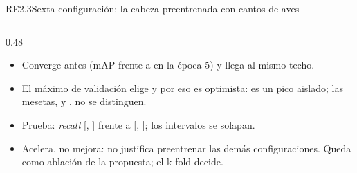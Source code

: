 \documentclass[aspectratio=169, 9pt]{beamer}
\begin{document}
\begin{frame}{RE2.3}{Sexta configuración: la cabeza preentrenada con cantos de aves}
\begin{columns}[T]
\begin{column}{0.48\textwidth}
            \begin{itemize}
                \item Converge antes (mAP \birdsEpochFive{} frente a \logmelEpochFive{} en la
                      época 5) y llega al mismo techo.
                \item El máximo de validación elige  y por eso es optimista:
                      \birdsBestMap{} es un pico aislado; las mesetas, \birdsPlateauMap{} y
                      \logmelPlateauMap{}, no se distinguen.
                \item Prueba: \textit{recall} \conNmsBirdsRecall{} [\conNmsBirdsRecallLow,
                      \conNmsBirdsRecallHigh] frente a \conNmsLogmelRecall{}
                      [\conNmsLogmelRecallLow, \conNmsLogmelRecallHigh]; los intervalos se
                      solapan.
                \item Acelera, no mejora: no justifica preentrenar las demás configuraciones.
                      Queda como ablación de la propuesta; el k-fold decide.
            \end{itemize}
        \end{column}
    \end{columns}
\end{frame}
\end{document}
